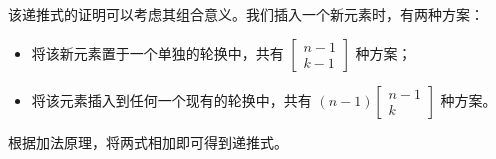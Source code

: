 该递推式的证明可以考虑其组合意义。我们插入一个新元素时，有两种方案：

\begin{itemize}
    \item 将该新元素置于一个单独的轮换中，共有 $\begin{bmatrix}n-1\\ k-1\end{bmatrix}$ 种方案；
    \item 将该元素插入到任何一个现有的轮换中，共有 $(n-1)\begin{bmatrix}n-1\\ k\end{bmatrix}$ 种方案。
\end{itemize}

根据加法原理，将两式相加即可得到递推式。